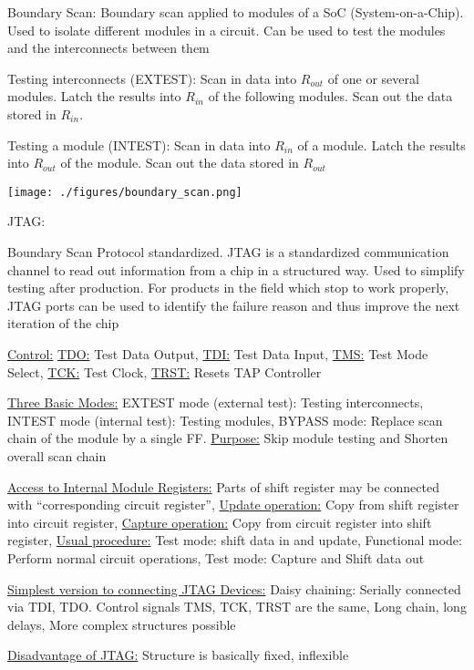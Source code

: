 \documentclass[landscape, a4paper]{article}
\begin{document}
\begin{minipage}[t]{0.2\linewidth}
\begin{betterlist}
		\item \alert{Boundary Scan:} Boundary scan applied to modules of a SoC (System-on-a-Chip). Used to isolate different modules in a circuit. Can be used to test the modules and the interconnects between them
		\begin{betterlist}
			\item Testing interconnects (EXTEST): Scan in data into $R_{out}$ of one or several modules. Latch the results into $R_{in}$ of the following modules. Scan out the data stored in $R_{in}$.
			\item Testing a module (INTEST): Scan in data into $R_{in}$ of a module. Latch the results into $R_{out}$ of the module. Scan out the data stored in $R_{out}$
		\end{betterlist}

		\texttt{[image: ./figures/boundary\_scan.png]}
		\item \alert{JTAG:}
		\begin{betterlist}
			\item Boundary Scan Protocol standardized. JTAG is a standardized communication channel to read out information from a chip in a structured way. Used to simplify testing after production. For products in the field which stop to work properly, JTAG ports can be used to identify the failure reason and thus improve the next iteration of the chip
			\item \underline{Control:} \underline{TDO:} Test Data Output, \underline{TDI:} Test Data Input, \underline{TMS:} Test Mode Select, \underline{TCK:} Test Clock, \underline{TRST:} Resets TAP Controller
			\item \underline{Three Basic Modes:} \alert{EXTEST mode (external test):} Testing interconnects, \alert{INTEST mode (internal test):} Testing modules, \alert{BYPASS mode:} Replace scan chain of the module by a single FF. \underline{Purpose:} Skip module testing and Shorten overall scan chain
			\item \underline{Access to Internal Module Registers:} Parts of shift register may be connected with \enquote{corresponding circuit register}, \underline{Update operation:} Copy from shift register into circuit register, \underline{Capture operation:} Copy from circuit register into shift register, \underline{Usual procedure:} \alert{Test mode:} shift data in and update, \alert{Functional mode:} Perform normal circuit operations, \alert{Test mode:} Capture and Shift data out
			\item \underline{Simplest version to connecting JTAG Devices:} \alert{Daisy chaining:} Serially connected via TDI, TDO. Control signals TMS, TCK, TRST are the same, Long chain, long delays, More complex structures possible
			\item \underline{Disadvantage of JTAG:} Structure is basically fixed, inflexible
		\end{betterlist}
	\end{betterlist}
\end{minipage}
\end{document}
